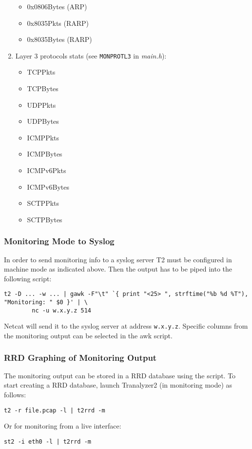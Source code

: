 \begin{multicols}{2}
\begin{enumerate}
\begin{itemize}
                \item 0x0806Bytes (ARP)
                \item 0x8035Pkts (RARP)
                \item 0x8035Bytes (RARP)
            \end{itemize}
        \item Layer 3 protocols stats (see {\tt MONPROTL3} in {\em main.h}):
            \begin{itemize}
                \item TCPPkts
                \item TCPBytes
                \item UDPPkts
                \item UDPBytes
                \item ICMPPkts
                \item ICMPBytes
                \item ICMPv6Pkts
                \item ICMPv6Bytes
                \item SCTPPkts
                \item SCTPBytes
            \end{itemize}
    \end{enumerate}
\end{multicols}

\subsubsection{Monitoring Mode to Syslog}
In order to send monitoring info to a syslog server T2 must be configured in machine mode as indicated above.
Then the output has to be piped into the following script:

\begin{lstlisting}
t2 -D ... -w ... | gawk -F"\t" `{ print "<25> ", strftime("%b %d %T"), "Monitoring: " $0 }' | \
        nc -u w.x.y.z 514
\end{lstlisting}

Netcat will send it to the syslog server at address {\tt w.x.y.z}.
Specific columns from the monitoring output can be selected in the awk script.

\subsubsection{RRD Graphing of Monitoring Output}
The monitoring output can be stored in a RRD database using the  script.
To start creating a RRD database, launch Tranalyzer2 (in monitoring mode) as follows:
\begin{center}
    {\tt t2 -r file.pcap -l | t2rrd -m}
\end{center}
Or for monitoring from a live interface:
\begin{center}
    {\tt st2 -i eth0 -l | t2rrd -m}
\end{center}

